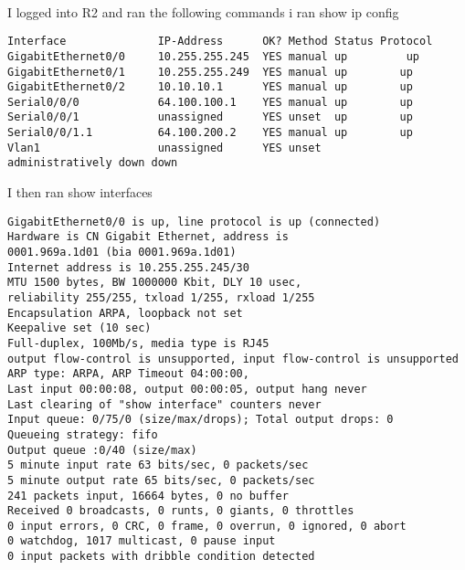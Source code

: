 \documentclass[../EngineeringJournal_CDavis.tex]{subfiles}
\begin{document}


\\
I logged into R2 and ran the following commands 
  i ran show ip config

\begin{mdframed}
\scriptsize
\begin{verbatim}
Interface              IP-Address      OK? Method Status Protocol 
GigabitEthernet0/0     10.255.255.245  YES manual up 	     up 
GigabitEthernet0/1     10.255.255.249  YES manual up        up 
GigabitEthernet0/2     10.10.10.1      YES manual up        up 
Serial0/0/0            64.100.100.1    YES manual up        up 
Serial0/0/1            unassigned      YES unset  up        up 
Serial0/0/1.1          64.100.200.2    YES manual up        up 
Vlan1                  unassigned      YES unset
administratively down down
\end{verbatim}
\normalsize
\end{mdframed}

I then ran  show interfaces
\begin{mdframed}
\scriptsize
\begin{verbatim}
GigabitEthernet0/0 is up, line protocol is up (connected)
Hardware is CN Gigabit Ethernet, address is 
0001.969a.1d01 (bia 0001.969a.1d01)
Internet address is 10.255.255.245/30
MTU 1500 bytes, BW 1000000 Kbit, DLY 10 usec,
reliability 255/255, txload 1/255, rxload 1/255
Encapsulation ARPA, loopback not set
Keepalive set (10 sec)
Full-duplex, 100Mb/s, media type is RJ45
output flow-control is unsupported, input flow-control is unsupported
ARP type: ARPA, ARP Timeout 04:00:00, 
Last input 00:00:08, output 00:00:05, output hang never
Last clearing of "show interface" counters never
Input queue: 0/75/0 (size/max/drops); Total output drops: 0
Queueing strategy: fifo
Output queue :0/40 (size/max)
5 minute input rate 63 bits/sec, 0 packets/sec
5 minute output rate 65 bits/sec, 0 packets/sec
241 packets input, 16664 bytes, 0 no buffer
Received 0 broadcasts, 0 runts, 0 giants, 0 throttles
0 input errors, 0 CRC, 0 frame, 0 overrun, 0 ignored, 0 abort
0 watchdog, 1017 multicast, 0 pause input
0 input packets with dribble condition detected

\end{verbatim}
\normalsize
\end{mdframed}
\end{document}
